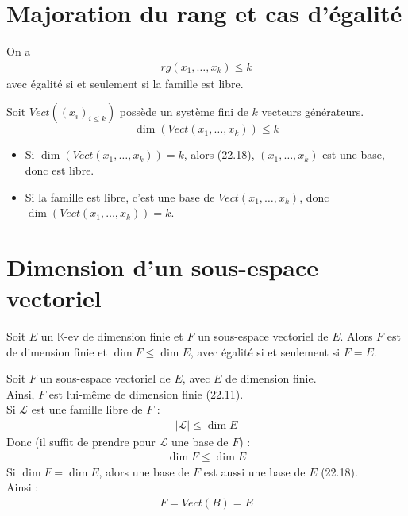 \documentclass[../main.tex]{subfiles}
\begin{document}
\section{Majoration du rang et cas d'égalité}
\begin{tcolorbox}[title=Propostion 22.20, title filled=false, colframe=lightblue, colback=lightblue!10!white]
    On a
    \begin{align*}
        rg (x_1, \ldots, x_k) \leq k
    \end{align*}
    avec égalité si et seulement si la famille est libre. 
\end{tcolorbox}

\noindent Soit $Vect((x_i)_{i\leq k})$ possède un système fini de $k$ vecteurs générateurs.  $$\dim (Vect(x_1, \ldots, x_k)) \leq k$$
\begin{itemize}
    \item Si $\dim(Vect(x_1, \ldots, x_k)) = k$, alors (22.18), $(x_1, \ldots, x_k)$ est une base, donc est libre. 
    \item Si la famille est libre, c'est une base de $Vect(x_1, \ldots, x_k)$, donc $\dim(Vect(x_1, \ldots, x_k)) = k$.
\end{itemize}

\section{Dimension d'un sous-espace vectoriel}
\begin{tcolorbox}[title=Propostion 22.22, title filled=false, colframe=lightblue, colback=lightblue!10!white]
    Soit $E$ un $\mathbb{K}$-ev de dimension finie et $F$ un sous-espace vectoriel de $E$. Alors $F$ est de dimension finie et $\dim F \leq \dim E$, avec égalité si et seulement si $F = E$.
\end{tcolorbox}

\noindent Soit $F$ un sous-espace vectoriel de $E$, avec $E$ de dimension finie. \\
Ainsi, $F$ est lui-même de dimension finie (22.11). \\
Si $\mathcal{L}$ est une famille libre de $F$ :
\begin{align*}
    |\mathcal{L}| \leq \dim E
\end{align*}
Donc (il suffit de prendre pour $\mathcal{L}$ une base de $F$) : 
\begin{align*}
    \dim F \leq \dim E
\end{align*}
Si $\dim F = \dim E$, alors une base de $F$ est aussi une base de $E$ (22.18). \\
Ainsi : 
\begin{align*}
    F = Vect(B) = E
\end{align*}
\end{document}
